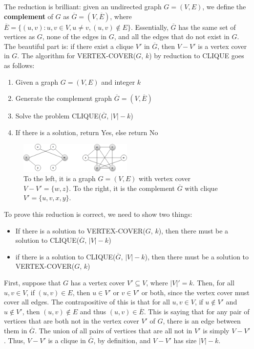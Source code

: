 \documentclass{article}
\begin{document}
The reduction is brilliant: given an undirected graph $G = (V, E)$, we define
the {\bf complement} of $G$ as $\overline {G} = (V, \overline{E})$, where
$\overline{E} = \{(u,v) : u, v \in V, u \ne v, (u, v) \notin E\}$. Essentially,
$\overline{G}$ has the same set of vertices as $G$, none of the edges in
$G$, and all the edges that do not exist in $G$.
The beautiful part is: if there exist a clique $V'$ in $\overline{G}$, 
then $V - V'$ is a vertex cover in $G$.
The algorithm for VERTEX-COVER($G$, $k$) by reduction to CLIQUE goes as follows:
\begin{enumerate}
\item Given a graph $G = (V, E)$ and integer $k$
\item Generate the complement graph $\overline{G} = (V, \overline{E})$
\item Solve the problem CLIQUE($\overline{G}$, $|V|-k$)
\item If there is a solution, return Yes, else return No
\end{enumerate}

\begin{figure}[H]
\centering
\includegraphics[width=0.5\textwidth]{clique_to_vertex_cover.png}
\caption{To the left, it is a graph $G = (V, E)$
	with vertex cover $V - V' = \{w, z\}$.
	To the right, it is the complement $\overline{G}$ with clique
	$V' = \{u, v, x, y\}$.}
\end{figure}

To prove this reduction is correct, we need to show two things:
\begin{itemize}
\item If there is a solution to VERTEX-COVER($G$, $k$), then there must
	be a solution to CLIQUE($\overline{G}$, $|V|-k$)
\item if there is a solution to CLIQUE($\overline{G}$, $|V|-k$), 
	then there must be a solution to VERTEX-COVER($G$, $k$)
\end{itemize}

First, suppose that $G$ has a vertex cover $V' \subseteq V$, where
$|V|' = k$. Then, for all $u, v \in V$, if $(u, v) \in E$,
then $u \in V'$ or $v \in V'$ or both, since the vertex cover must 
cover all edges. The contrapositive of this is that for all $u,v \in V$,
if $u \notin V'$ and $u \notin V'$, then $(u, v) \notin E$ and thus 
$(u,v) \in \overline{E}$. This is saying that for any pair of vertices
that are both not in the vertex cover $V'$ of $G$, 
there is an edge between them in $\overline{G}$. 
The union of all pairs of vertices that are all not in $V'$ is simply
$V - V'$. Thus, $V-V'$ is a clique in $\overline{G}$, by definition,
and $V-V'$ has size $|V| - k$.
\end{document}
